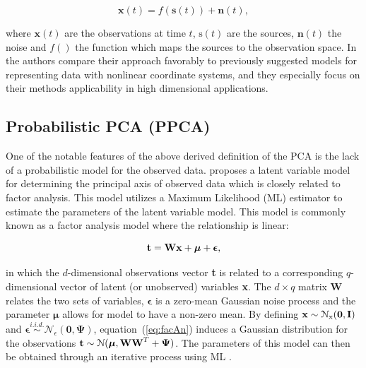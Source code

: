 \begin{equation}\label{eq:nonlinear}
\textbf{x}(t) = f\left(\textbf{s}(t)\right) + \textbf{n}\left(t\right),
\end{equation}

where $\textbf{x}(t)$ are the observations at time $t$, $\text{s}(t)$ are the sources, $\textbf{n}(t)$ the noise and $f()$ the function which maps the sources to the observation space. In \cite{Lappalainen2000} the authors compare their approach favorably to previously suggested models for representing data with nonlinear coordinate systems, and they especially focus on their methods applicability in high dimensional applications.


\subsection{Probabilistic PCA (PPCA)}
One of the notable features of the above derived definition of the PCA is the lack of a probabilistic model for the observed data. \cite{Tipping1999} proposes a latent variable model for determining the principal axis of observed data which is closely related to factor analysis. This model utilizes a Maximum Likelihood (ML) estimator to estimate the parameters of the latent variable model. This model is commonly known as a factor analysis model where the relationship is linear:

\begin{equation}\label{eq:facAn}
\textrm{\textbf{t}} = \textrm{\textbf{W}}\textrm{\textbf{x}} + \boldsymbol\mu + \boldsymbol\epsilon,
\end{equation}

in which the $d$-dimensional observations vector \textbf{t} is related to a corresponding $q$-dimensional vector of latent (or unobserved) variables \textbf{x}. The $d \times q$ matrix \textbf{W} relates the two sets of variables, $\boldsymbol\epsilon$ is a zero-mean Gaussian noise process and the parameter $\boldsymbol\mu$ allows for model to have a non-zero mean. By defining $\textrm{\textbf{x}} \sim \mathcal{N}_\textrm{x}(\boldsymbol0,\textrm{\textbf{I}})$ and $\boldsymbol\epsilon \stackrel{i.i.d.}{\sim} \mathcal{N}_\epsilon(\boldsymbol0,\boldsymbol\Psi)$, equation~(\ref{eq:facAn}) induces a Gaussian distribution for the observations $\textrm{\textbf{t}} \sim \mathcal{N}(\boldsymbol\mu,\textrm{\textbf{W}}\textrm{\textbf{W}}^T + \boldsymbol\Psi)$. The parameters of this model can then be obtained through an iterative process using ML \citep{Tipping1999}.

